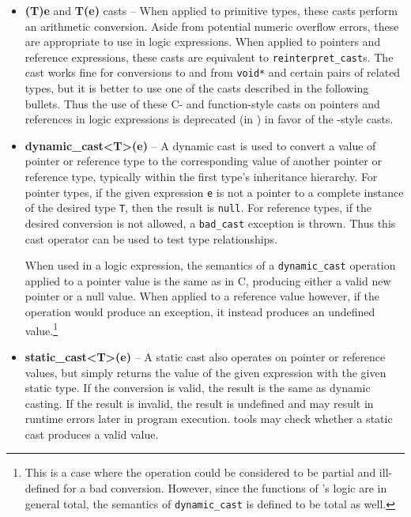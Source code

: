 \begin{itemize}
	\item \textbf{(T)e} and \textbf{T(e)} casts -- When applied to primitive types, these casts perform an arithmetic conversion. Aside from potential numeric overflow errors, these are appropriate to use in logic expressions. When applied to pointers and reference expressions, these casts are equivalent to
	\lstinline|reinterpret_cast|s. The cast works fine for conversions to and from \lstinline|void*| and certain pairs of related types, but it is better to use one of
	the \lang{} casts described in the following bullets.
	Thus the use of these C- and function-style casts on 
	pointers and references in logic expressions is 
	deprecated (in \NAME{}) in favor of the \lang{}-style casts.
	
	\item \textbf{dynamic\_cast<T>(e)} -- A dynamic cast is used to convert a value of pointer or reference type to the corresponding value of another pointer or reference type, typically within the first type's inheritance hierarchy. For pointer types, if the given expression \lstinline|e| is not a pointer to a complete instance of the desired type \lstinline|T|, then the result is \lstinline|null|. For reference types, if the desired conversion is not allowed, a \lstinline|bad_cast| exception is thrown. Thus this cast operator can be used to test type relationships.
	
	When used in a logic expression, the semantics of a \lstinline|dynamic_cast| operation applied to a pointer value is the same as in C, producing either a valid new pointer or a null value. When applied to a reference value however, if the operation would produce an exception, it instead produces an undefined value.\footnote{This is a case where the operation could be considered to be partial and ill-defined for a bad conversion. However, since the  functions of \NAME{}'s logic are in general total, the semantics of \lstinline|dynamic_cast| is defined to be total as well.}  
	
	\item \textbf{static\_cast<T>(e)} -- A static cast also operates on pointer or reference values, but simply returns the value of the given expression with the given static type. If the conversion is valid, the result is the same as dynamic casting. If the result is invalid, the result is undefined and may result in runtime errors later in program execution. \NAME{} tools may check whether a static cast produces a valid value.
	

\end{itemize}
